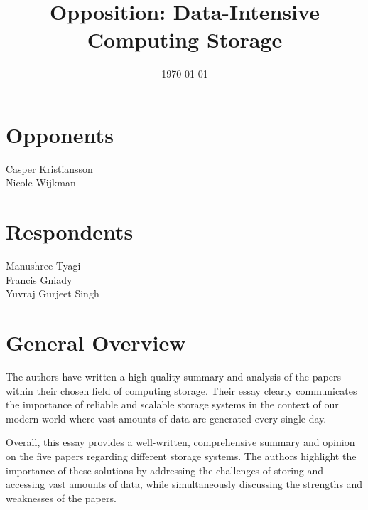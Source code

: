 \documentclass[12pt]{article}
\title{Opposition: Data-Intensive Computing Storage}
\date{\today}
\begin{document}
\maketitle

\noindent %
\begin{minipage}{0.5\textwidth}
    \centering
    \section*{Opponents}
    Casper Kristiansson \\
    Nicole Wijkman
\end{minipage}%
\begin{minipage}{0.5\textwidth}
    \centering
    \section*{Respondents}
    Manushree Tyagi \\
    Francis Gniady \\
    Yuvraj Gurjeet Singh
\end{minipage}


\section{General Overview}

The authors have written a high-quality summary and analysis of the papers within their chosen field of computing storage. Their essay clearly communicates the importance of reliable and scalable storage systems in the context of our modern world where vast amounts of data are generated every single day.

Overall, this essay provides a well-written, comprehensive summary and opinion on the five papers regarding different storage systems. The authors highlight the importance of these solutions by addressing the challenges of storing and accessing vast amounts of data, while simultaneously discussing the strengths and weaknesses of the papers.


\end{document}
